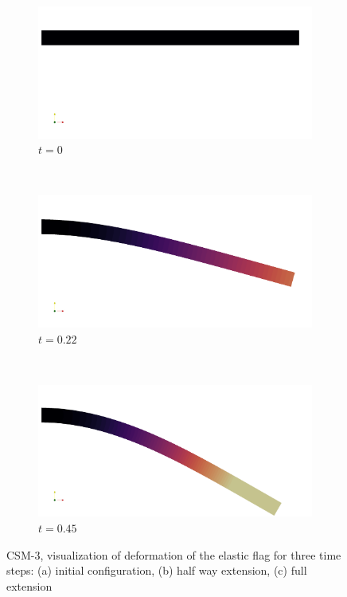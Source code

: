 \begin{figure}
    \centering
    \begin{subfigure}[b]{0.3\textwidth}
        \includegraphics[width=\textwidth]{./Fig/csm3_1.png}
       \caption{$t = 0$}
        \label{fig:gull}
    \end{subfigure}
    ~ %
    \begin{subfigure}[b]{0.3\textwidth}
        \includegraphics[width=\textwidth]{./Fig/csm3_2.png}
               \caption{$t = 0.22$}
        \label{fig:tiger}
    \end{subfigure}
    ~ %
    \begin{subfigure}[b]{0.3\textwidth}
        \includegraphics[width=\textwidth]{./Fig/csm3_3.png}
        \caption{$t = 0.45$}
        \label{fig:mouse}
    \end{subfigure}
    \caption{CSM-3, visualization of deformation of the elastic flag for three time steps: (a) initial configuration, (b) half way extension, (c) full extension }
 \label{fig:bender}
\end{figure}
